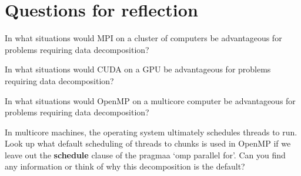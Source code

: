 \documentclass[letterpaper,10pt,openany,oneside]{sphinxmanual}
\begin{document}
\section{Questions for reflection}
\label{Decomposition/Variations:questions-for-reflection}
In what situations would MPI on a cluster of computers be advantageous for problems requiring data decomposition?

In what situations would CUDA on a GPU be advantageous for problems requiring data decomposition?

In what situations would OpenMP on a multicore computer be advantageous for problems requiring data decomposition?

In multicore machines, the operating system ultimately schedules threads to run.  Look up what default scheduling of threads to chunks is used in OpenMP if we leave out the \textbf{schedule} clause of the pragmaa `omp parallel for'. Can you find any information or think of why this decomposition is the default?



\renewcommand{\indexname}{Index}
\printindex
\end{document}
